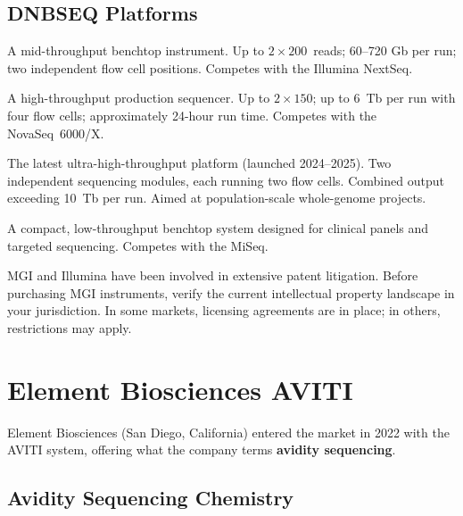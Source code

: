 \subsection{DNBSEQ Platforms}

\begin{description}[style=nextline, font=\bfseries]
  \item[DNBSEQ-G400 (MGISEQ-2000)] A mid-throughput benchtop instrument. Up to $2 \times 200$\basepair\ reads; 60--720 Gb per run; two independent flow cell positions. Competes with the Illumina NextSeq.

  \item[DNBSEQ-T7] A high-throughput production sequencer. Up to $2 \times 150$\basepair; up to 6~Tb per run with four flow cells; approximately 24-hour run time. Competes with the NovaSeq~6000/X.

  \item[DNBSEQ-T20$\times$2] The latest ultra-high-throughput platform (launched 2024--2025). Two independent sequencing modules, each running two flow cells. Combined output exceeding 10~Tb per run. Aimed at population-scale whole-genome projects.

  \item[DNBSEQ-G99] A compact, low-throughput benchtop system designed for clinical panels and targeted sequencing. Competes with the MiSeq.
\end{description}

\begin{tipbox}[title={Intellectual Property Considerations}]
MGI and Illumina have been involved in extensive patent litigation. Before purchasing MGI instruments, verify the current intellectual property landscape in your jurisdiction. In some markets, licensing agreements are in place; in others, restrictions may apply.
\end{tipbox}


\section{Element Biosciences AVITI}
\label{sec:element}

Element Biosciences (San Diego, California) entered the market in 2022 with the AVITI system, offering what the company terms \textbf{avidity sequencing}.

\subsection{Avidity Sequencing Chemistry}

